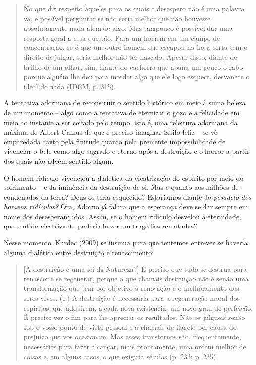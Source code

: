 \begin{quote}
No que diz respeito àqueles para os quais o desespero não é uma palavra
vã, é possível perguntar se não seria melhor que não houvesse
absolutamente nada além de algo. Mas tampouco é possível dar uma
resposta geral a essa questão. Para um homem em um campo de
concentração, se é que um outro homem que escapou na hora certa tem o
direito de julgar, seria melhor não ter nascido. Apesar disso, diante do
brilho de um olhar, sim, diante do cachorro que abana um pouco o rabo
porque alguém lhe deu para morder algo que ele logo esquece, desvanece o
ideal do nada (IDEM, p. 315).
\end{quote}

A tentativa adorniana de reconstruir o sentido histórico em meio à suma
beleza de um momento -- algo como a tentativa de eternizar o gozo e a
felicidade em meio ao instante a ser ceifado pelo tempo, isto é, uma
releitura adorniana da máxima de Albert Camus de que é preciso imaginar
Sísifo feliz -- se vê emparedada tanto pela finitude quanto pela
premente impossibilidade de vivenciar o belo como algo sagrado e eterno
após a destruição e o horror a partir dos quais não advém sentido algum.

O homem ridículo vivenciou a dialética da cicatrização do espírito por
meio do sofrimento -- e da iminência da destruição de si. Mas e quanto
aos milhões de condenados da terra? Deus os teria esquecido? Estaríamos
diante do \emph{pesadelo dos homens ridículos?} Ora, Adorno já falara
que a esperança deve se dar sempre em nome dos desesperançados. Assim,
se o homem ridículo desvelou a eternidade, que sentido cicatrizante
poderia haver em tragédias rematadas?

Nesse momento, Kardec (2009) se insinua para que tentemos entrever se
haveria alguma dialética entre destruição e renascimento:

\begin{quote}
{[}A destruição é uma lei da Natureza?{]} É preciso que tudo se destrua
para renascer e se regenerar, porque o que chamais destruição não é
senão uma transformação que tem por objetivo a renovação e o
melhoramento dos seres vivos. (\ldots{}) A destruição é necessária para
a regeneração moral dos espíritos, que adquirem, a cada nova existência,
um novo grau de perfeição. É preciso ver o fim para lhe apreciar os
resultados. Não os julgueis senão sob o vosso ponto de vista pessoal e a
chamais de flagelo por causa do prejuízo que vos ocasionam. Mas esses
transtornos são, frequentemente, necessários para fazer alcançar, mais
prontamente, uma ordem melhor de coisas e, em alguns casos, o que
exigiria séculos (p. 233; p. 235).
\end{quote}

